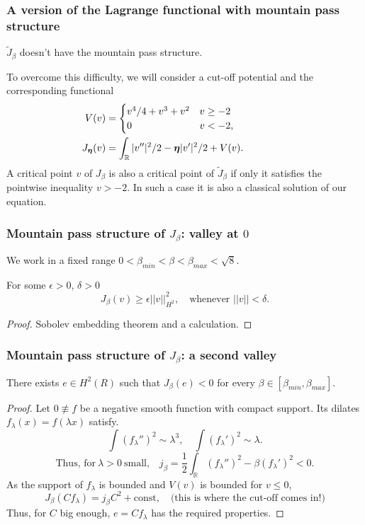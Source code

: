 \documentclass[9pt, english]{beamer}
\theoremstyle{definition}
\newcommand{\R}{\mathbb{R}}                     %
\begin{document}
\begin{frame}
\frametitle{A version of the Lagrange functional with mountain pass
structure} $\tilde J_\beta$ doesn't have the mountain pass
structure.

To overcome this difficulty, we will consider a cut-off potential
and the corresponding functional
\begin{align*}
V(v) &=
\begin{minipage}{6cm}
$\begin{cases}
v^4 / 4 + v^3 + v^2 & v \geq -2\\
0 & v < -2,
\end{cases}$
\end{minipage}
\\
J_\beta(v) &= \int_\R |v''|^2 / 2 - \beta |v'|^2 / 2 + V(v).
\end{align*}
A critical point $v$ of $J_\beta$ is also a critical point of
$\tilde J_\beta$ if only it satisfies the pointwise inequality
$v>-2$. In such a case it is also a classical solution of our
equation.
\end{frame}


\begin{frame}
\frametitle{Mountain pass structure of $J_\beta$: valley at $0$} We
work in a fixed range $0 < \beta_{min} < \beta < \beta_{max} < \sqrt
8$.
\begin{lemma}
For some $\epsilon > 0$, $\delta > 0$
\[
J_\beta(v) \geq \epsilon ||v||_{H^2}^2, \quad \text{whenever } ||v||
< \delta.
\]
\end{lemma}
\begin{proof}
Sobolev embedding theorem and a calculation.
\end{proof}
\end{frame}

\begin{frame}
\frametitle{Mountain pass structure of $J_\beta$: a second valley}
\begin{lemma}
There exists $e \in H^2(R)$ such that $J_\beta(e)<0$ for every
$\beta \in [\beta_{min},\beta_{max}]$.
\end{lemma}
\begin{proof}
Let $0 \not\equiv f$ be a negative smooth function with compact
support. Its dilates $f_\lambda(x)=f(\lambda x)$ satisfy.
\[
\int (f_\lambda'')^2 \sim \lambda^3, \quad \int (f_\lambda')^2 \sim
\lambda.
\]
\[
\text{Thus, for}\  \lambda>0\ \text{small,} \quad j_\beta = \frac12
\int_\R (f_\lambda'')^2 - \beta (f_\lambda')^2 < 0.
\]
As the support of $f_\lambda$ is bounded and $V(v)$ is bounded for
$v\leq 0$,
\[
J_\beta(C f_\lambda) = j_\beta C^2 + \text{const}, \quad \text{(this
is where the cut-off comes in!)}
\]
Thus, for $C$ big enough, $e = C f_\lambda$ has the required
properties.
\end{proof}
\end{frame}
\end{document}
